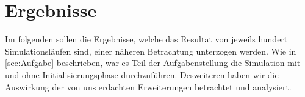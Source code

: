 \documentclass[12pt,fleqn,a4paper]{article}
\begin{document}
\section{Ergebnisse}
Im folgenden sollen die Ergebnisse, welche das Resultat von jeweils hundert Simulationsl\"{a}ufen sind, einer n\"{a}heren Betrachtung unterzogen werden.
Wie in \ref{sec:Aufgabe} beschrieben, war es Teil der Aufgabenstellung die Simulation mit und ohne Initialisierungsphase durchzuf\"{u}hren.
Desweiteren haben wir die Auswirkung  der von uns erdachten Erweiterungen betrachtet und analysiert.





\newpage
%
%
\end{document}
